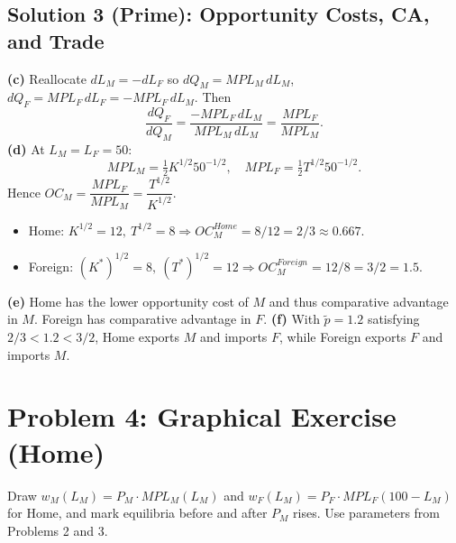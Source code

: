 \documentclass[12pt]{article}
\begin{document}
\subsection*{Solution 3 (Prime): Opportunity Costs, CA, and Trade}
\textbf{(c)} Reallocate $dL_M=-dL_F$ so $dQ_M=MPL_M\,dL_M$, $dQ_F=MPL_F\,dL_F=-MPL_F\,dL_M$. Then
\[
\frac{dQ_F}{dQ_M}=\frac{-MPL_F\,dL_M}{MPL_M\,dL_M}=\frac{MPL_F}{MPL_M}.
\]
\textbf{(d)} At $L_M=L_F=50$:
\[
MPL_M = \tfrac12 K^{1/2} 50^{-1/2},\quad MPL_F = \tfrac12 T^{1/2} 50^{-1/2}.
\]
Hence $OC_M = \dfrac{MPL_F}{MPL_M} = \dfrac{T^{1/2}}{K^{1/2}}$.
\begin{itemize}
\item Home: $K^{1/2}=12,\ T^{1/2}=8 \Rightarrow OC_M^{Home}=8/12=2/3 \approx 0.667$.
\item Foreign: $(K^{*})^{1/2}=8,\ (T^{*})^{1/2}=12 \Rightarrow OC_M^{Foreign}=12/8=3/2=1.5$.
\end{itemize}
\textbf{(e)} Home has the lower opportunity cost of $M$ and thus comparative advantage in $M$. Foreign has comparative advantage in $F$.
\textbf{(f)} With $\tilde p=1.2$ satisfying $2/3<1.2<3/2$, Home exports $M$ and imports $F$, while Foreign exports $F$ and imports $M$.

\bigskip
\newpage
\section*{Problem 4: Graphical Exercise (Home)}
Draw $w_M(L_M)=P_M \cdot MPL_M(L_M)$ and $w_F(L_M)=P_F \cdot MPL_F(100-L_M)$ for Home, and mark equilibria before and after $P_M$ rises. Use parameters from Problems 2 and 3.
\end{document}
